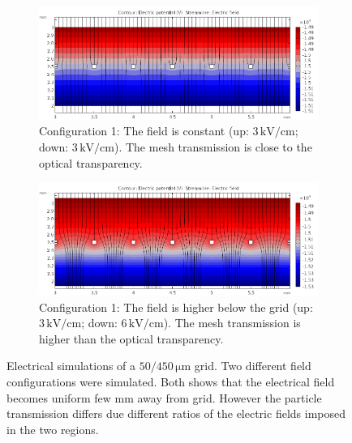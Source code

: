 \begin{figure}[!ht]
	\centering
	\begin{subfigure}[t]{\textwidth}
		\includegraphics[width=\textwidth]{03_Prototype/figures/fig027_Grid1.png}
		\caption[]{Configuration 1: The field is constant (up: \(3\,\mathrm{kV/cm}\); down: \(3\,\mathrm{kV/cm}\)). The mesh transmission is close to the optical transparency.}
		\label{chap3:Grid1}
	\end{subfigure}

	\begin{subfigure}[t]{\textwidth}
		\centering
		\includegraphics[width=\textwidth]{03_Prototype/figures/fig027_Grid2.png}
		\caption[]{Configuration 1: The field is higher below the grid (up: \(3\,\mathrm{kV/cm}\); down: \(6\,\mathrm{kV/cm}\)). The mesh transmission is higher than the optical transparency.}
		\label{chap3:Grid2}
	\end{subfigure}
	\caption[Electrical simulations of a \(50/450\,\mathrm{\mu m}\) grid]{Electrical simulations of a \(50/450\,\mathrm{\mu m}\) grid. Two different field configurations were simulated. Both shows that the electrical field becomes uniform few mm away from grid. However the particle transmission differs due different ratios of the electric fields imposed in the two regions.}
	\label{chap3:Grid}
\end{figure}

